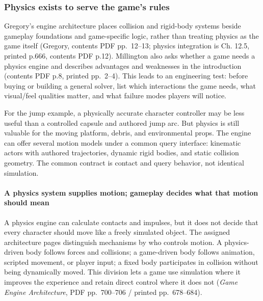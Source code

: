 \subsubsection{Physics exists to serve the game's rules}\label{06-engine-ii-ch033-physics-exists-to-serve-the-games-rules}

\hypertarget{06-engine-ii-ch033-physics-exists-to-serve-the-games-rules}{}

Gregory's engine architecture places collision and rigid-body systems beside gameplay foundations and game-specific logic, rather than treating physics as the game itself (Gregory, contents PDF pp.~12--13; physics integration is Ch. 12.5, printed p.666, contents PDF p.12). Millington also asks whether a game needs a physics engine and describes advantages and weaknesses in the introduction (contents PDF p.8, printed pp.~2--4). This leads to an engineering test: before buying or building a general solver, list which interactions the game needs, what visual/feel qualities matter, and what failure modes players will notice.

For the jump example, a physically accurate character controller may be less useful than a controlled capsule and authored jump arc. But physics is still valuable for the moving platform, debris, and environmental props. The engine can offer several motion models under a common query interface: kinematic actors with authored trajectories, dynamic rigid bodies, and static collision geometry. The common contract is contact and query behavior, not identical simulation.

\paragraph{A physics system supplies motion; gameplay decides what that motion should mean}\label{06-engine-ii-ch033-a-physics-system-supplies-motion-gameplay-decides-what-that-motion-should-mean}

\hypertarget{06-engine-ii-ch033-a-physics-system-supplies-motion-gameplay-decides-what-that-motion-should-mean}{}

A physics engine can calculate contacts and impulses, but it does not decide that every character should move like a freely simulated object. The assigned architecture pages distinguish mechanisms by who controls motion. A physics-driven body follows forces and collisions; a game-driven body follows animation, scripted movement, or player input; a fixed body participates in collision without being dynamically moved. This division lets a game use simulation where it improves the experience and retain direct control where it does not (\emph{Game Engine Architecture}, PDF pp.~700--706 / printed pp.~678--684).

